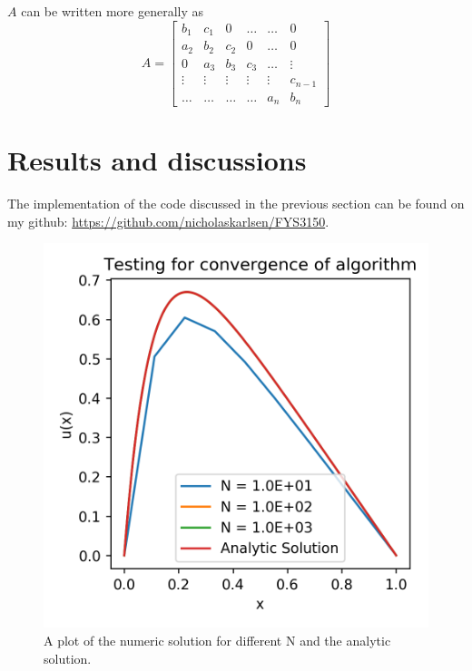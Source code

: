 \documentclass[10pt,showpacs,preprintnumbers,footinbib,amsmath,amssymb,aps,prl,twocolumn,groupedaddress,superscriptaddress,showkeys]{revtex4-1}
\begin{document}
  $A$ can be written more generally as
  \begin{equation}
    \label{A matrix}
    A = \left[ 
    \begin{matrix}
      b_1 & c_1 & 0 & \dots  & \dots &0 \\
      a_2 & b_2 & c_2 & 0 & \dots &  0 \\
      0 & a_3 & b_3 & c_3 & \dots & \vdots  \\
      \vdots & \vdots & \vdots & \vdots & \vdots & c_{n-1}\\
      \dots & \dots & \dots & \dots & a_n & b_n
    \end{matrix}
    \right]
  \end{equation}



\section{Results and discussions}
  The implementation of the code discussed in the previous section can be found on my github: \url{https://github.com/nicholaskarlsen/FYS3150}. 


  \begin{figure}[hbtp]
    \center
    \includegraphics[scale=.7]{figs/ex1c_compare.png}
    \caption{A plot of the numeric solution for different N and the analytic solution.}
  \end{figure}
\end{document}
